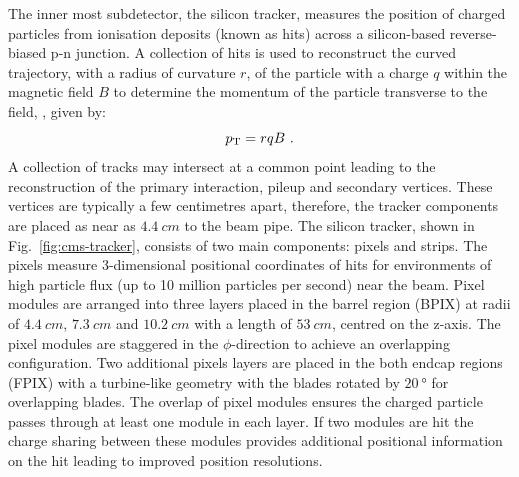 The inner most subdetector, the silicon tracker, measures the position of
charged particles from ionisation deposits (known as hits) across a
silicon-based reverse-biased p-n junction. A collection of hits is used to
reconstruct the curved trajectory, with a radius of curvature $r$, of the
particle with a charge $q$ within the magnetic field $B$ to determine the
momentum of the particle transverse to the field, \pt, given by:
%
\begin{equation}
    p_{\text{T}} = rqB\ .
\end{equation}
%
A collection of tracks may intersect at a common point leading to the
reconstruction of the primary interaction, pileup and secondary vertices.
These vertices are typically a few centimetres apart, therefore, the tracker
components are placed as near as ${\SI{4.4}{cm}}$ to the beam pipe.  The
silicon tracker, shown in Fig.~\ref{fig:cms-tracker}, consists of two main
components: pixels and strips. The pixels measure 3-dimensional positional
coordinates of hits for environments of high particle flux (up to 10 million
particles per second) near the beam. Pixel modules are arranged into three
layers placed in the barrel region (BPIX) at radii of ${\SI{4.4}{cm}}$,
${\SI{7.3}{cm}}$ and ${\SI{10.2}{cm}}$ with a length of ${\SI{53}{cm}}$,
centred on the z-axis. The pixel modules are staggered in the $\phi$-direction
to achieve an overlapping configuration. Two additional pixels layers are
placed in the both endcap regions (FPIX) with a turbine-like geometry with the
blades rotated by ${\SI{20}{\degree}}$ for overlapping blades. The overlap of
pixel modules ensures the charged particle passes through at least one module
in each layer. If two modules are hit the charge sharing between these modules
provides additional positional information on the hit leading to improved
position resolutions.

